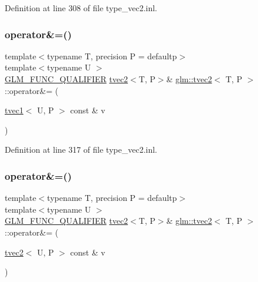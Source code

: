 Definition at line 308 of file type\+\_\+vec2.\+inl.

\mbox{\label{structglm_1_1tvec2_a061aeb63e00510f372dc949c7ad5af98}} 
\subsubsection{\texorpdfstring{operator\&=()}{operator\&=()}\hspace{0.1cm}{\footnotesize\ttfamily [5/6]}}
{\footnotesize\ttfamily template$<$typename T, precision P = defaultp$>$ \\
template$<$typename U $>$ \\
\mbox{\hyperlink{setup_8hpp_a33fdea6f91c5f834105f7415e2a64407}{G\+L\+M\+\_\+\+F\+U\+N\+C\+\_\+\+Q\+U\+A\+L\+I\+F\+I\+ER}} \mbox{\hyperlink{structglm_1_1tvec2}{tvec2}}$<$T, P$>$\& \mbox{\hyperlink{structglm_1_1tvec2}{glm\+::tvec2}}$<$ T, P $>$\+::operator\&= (\begin{DoxyParamCaption}\item[{\mbox{\hyperlink{structglm_1_1tvec1}{tvec1}}$<$ U, P $>$ const \&}]{v }\end{DoxyParamCaption})}



Definition at line 317 of file type\+\_\+vec2.\+inl.

\mbox{\label{structglm_1_1tvec2_a9b368287482b9a3218f99cc238d0ac97}} 
\subsubsection{\texorpdfstring{operator\&=()}{operator\&=()}\hspace{0.1cm}{\footnotesize\ttfamily [6/6]}}
{\footnotesize\ttfamily template$<$typename T, precision P = defaultp$>$ \\
template$<$typename U $>$ \\
\mbox{\hyperlink{setup_8hpp_a33fdea6f91c5f834105f7415e2a64407}{G\+L\+M\+\_\+\+F\+U\+N\+C\+\_\+\+Q\+U\+A\+L\+I\+F\+I\+ER}} \mbox{\hyperlink{structglm_1_1tvec2}{tvec2}}$<$T, P$>$\& \mbox{\hyperlink{structglm_1_1tvec2}{glm\+::tvec2}}$<$ T, P $>$\+::operator\&= (\begin{DoxyParamCaption}\item[{\mbox{\hyperlink{structglm_1_1tvec2}{tvec2}}$<$ U, P $>$ const \&}]{v }\end{DoxyParamCaption})}



